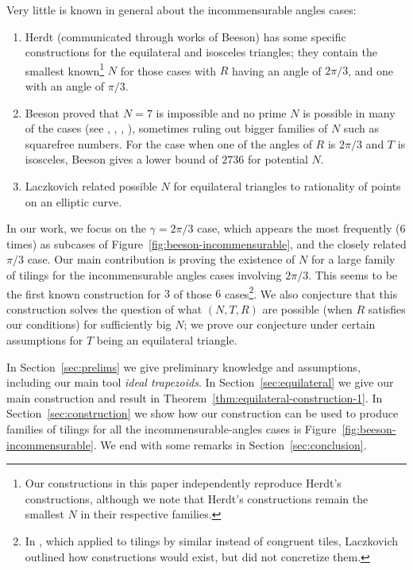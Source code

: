 \documentclass{amsart}
\theoremstyle{plain}
\theoremstyle{definition}
\begin{document}
Very little is known in general about the incommensurable angles cases:
\begin{enumerate}
    \item Herdt (communicated through works of Beeson) has some specific constructions for the equilateral and isosceles triangles; they contain the smallest known\footnote{Our constructions in this paper independently reproduce Herdt's constructions, although we note that Herdt's constructions remain the smallest $N$ in their respective families.} $N$ for those cases with $R$ having an angle of $2\pi/3$, and one with an angle of $\pi/3$.  
    \item Beeson proved that $N=7$ is impossible \cite{beeson-seven} and no prime $N$ is possible in many of the cases (see \cite{beeson-seven}, \cite{beeson-equilateral}, \cite{beeson-isosceles}, \cite{beeson-triangletiling3}), sometimes ruling out bigger families of $N$ such as squarefree numbers. For the case when one of the angles of $R$ is $2\pi/3$ and $T$ is isosceles, Beeson \cite{beeson-isosceles} gives a lower bound of $2736$ for potential $N$.
    \item Laczkovich \cite{laczkovich2020rational} related possible $N$ for equilateral triangles to rationality of points on an elliptic curve.
\end{enumerate} 

In our work, we focus on the $\gamma = 2\pi/3$ case, which appears the most frequently ($6$ times) as subcases of Figure~\ref{fig:beeson-incommensurable}, and the closely related $\pi/3$ case. Our main contribution is proving the existence of $N$ for a large family of tilings for the incommensurable angles cases involving $2\pi/3$. This seems to be the first known construction for $3$ of those $6$ cases\footnote{In \cite{laczkovich1995tilings}, which applied to tilings by similar instead of congruent tiles, Laczkovich outlined how constructions would exist, but did not concretize them.}. We also conjecture that this construction solves the question of what $(N,T,R)$ are possible (when $R$ satisfies our conditions) for sufficiently big $N$; we prove our conjecture under certain assumptions for $T$ being an equilateral triangle.

In Section~\ref{sec:prelims} we give preliminary knowledge and assumptions, including our main tool \emph{ideal trapezoids}. In Section~\ref{sec:equilateral} we give our main construction and result in Theorem~\ref{thm:equilateral-construction-1}. In Section~\ref{sec:construction} we show how our construction can be used to produce families of tilings for all the incommensurable-angles cases is Figure~\ref{fig:beeson-incommensurable}. We end with some remarks in Section~\ref{sec:conclusion}. 
\end{document}
